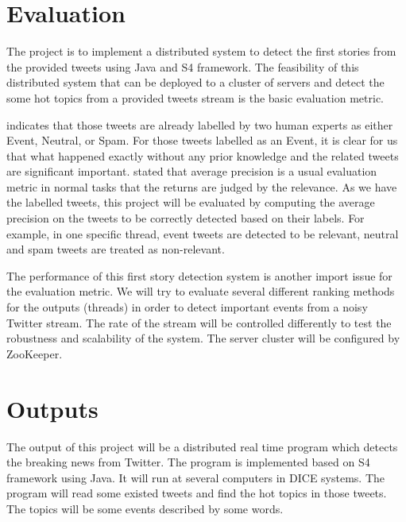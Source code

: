 \documentclass[a4paper,12pt]{article}
\begin{document}
\section{Evaluation}


The project is to implement a distributed system to detect the first stories from the provided tweets using Java and S4 framework. The feasibility of this distributed system that can be deployed to a cluster of servers and detect the some hot topics from a provided tweets stream is the basic evaluation metric. \newline

\citep{Petrovic:2010} indicates that those tweets are already labelled by two human experts as either Event, Neutral, or Spam. For those tweets labelled as an Event, it is clear for us that what happened exactly without any prior knowledge and the related tweets are significant important. \citep{212975} stated that average precision is a usual evaluation metric in normal tasks that the returns are judged by the relevance. As we have the labelled tweets, this project will be evaluated by computing the average precision on the tweets to be correctly detected based on their labels. For example,  in one specific thread, event tweets are detected to be relevant, neutral and spam tweets are treated as non-relevant. \newline

The performance of this first story detection system is another import issue for the evaluation metric. We will try to evaluate several different ranking methods for the outputs (threads) in order to detect important events from a noisy Twitter stream. The rate of the stream will be controlled differently to test the robustness and scalability of the system. The server cluster will be configured by ZooKeeper. 



\section{Outputs}



The output of this project will be a distributed real time program which detects the breaking news from Twitter. The program is implemented based on S4 framework using Java. It will run at several computers in DICE systems. The program will read some existed tweets and find the hot topics in those tweets. The topics will be some events described by some words. 
\end{document}

